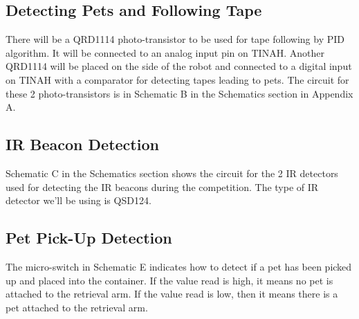 \documentclass[11pt, oneside]{article} %
\begin{document}
	\subsection{Detecting Pets and Following Tape}
	
	There will be a QRD1114 photo-transistor to be used for tape following by PID algorithm. It will be connected to an analog input pin on TINAH. Another QRD1114 will be placed on the side of the robot and connected to a digital input on TINAH with a comparator for detecting tapes leading to pets. The circuit for these 2 photo-transistors is in Schematic B in the Schematics section in Appendix A. 
	
	\subsection{IR Beacon Detection}
	
	Schematic C in the Schematics section shows the circuit for the 2 IR detectors used for detecting the IR beacons during the competition. The type of IR detector we'll be using is QSD124.
	
	\subsection{Pet Pick-Up Detection}
	
	The micro-switch in Schematic E indicates how to detect if a pet has been picked up and placed into the container. If the value read is high, it means no pet is attached to the retrieval arm. If the value read is low, then it means there is a pet attached to the retrieval arm. 
	
\end{document}
